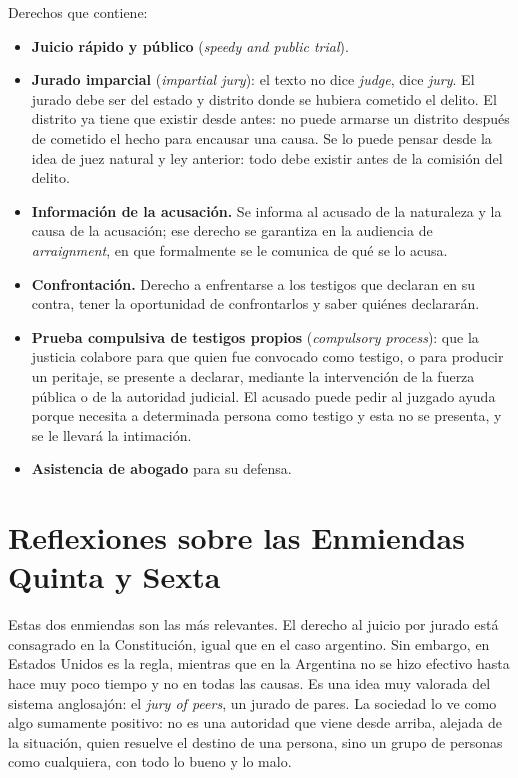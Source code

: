 \documentclass[12pt,oneside]{book}
\begin{document}
Derechos que contiene:

\begin{itemize}
    \item \textbf{Juicio rápido y público} (\textit{speedy and public trial}).
    \item \textbf{Jurado imparcial} (\textit{impartial jury}): el texto no dice \textit{judge}, dice \textit{jury}. El jurado debe ser del estado y distrito donde se hubiera cometido el delito. El distrito ya tiene que existir desde antes: no puede armarse un distrito después de cometido el hecho para encausar una causa. Se lo puede pensar desde la idea de juez natural y ley anterior: todo debe existir antes de la comisión del delito.
    \item \textbf{Información de la acusación.} Se informa al acusado de la naturaleza y la causa de la acusación; ese derecho se garantiza en la audiencia de \textit{arraignment}, en que formalmente se le comunica de qué se lo acusa.
    \item \textbf{Confrontación.} Derecho a enfrentarse a los testigos que declaran en su contra, tener la oportunidad de confrontarlos y saber quiénes declararán.
    \item \textbf{Prueba compulsiva de testigos propios} (\textit{compulsory process}): que la justicia colabore para que quien fue convocado como testigo, o para producir un peritaje, se presente a declarar, mediante la intervención de la fuerza pública o de la autoridad judicial. El acusado puede pedir al juzgado ayuda porque necesita a determinada persona como testigo y esta no se presenta, y se le llevará la intimación.
    \item \textbf{Asistencia de abogado} para su defensa.
\end{itemize}

\section{Reflexiones sobre las Enmiendas Quinta y Sexta}

Estas dos enmiendas son las más relevantes. El derecho al juicio por jurado está consagrado en la Constitución, igual que en el caso argentino. Sin embargo, en Estados Unidos es la regla, mientras que en la Argentina no se hizo efectivo hasta hace muy poco tiempo y no en todas las causas. Es una idea muy valorada del sistema anglosajón: el \textit{jury of peers}, un jurado de pares. La sociedad lo ve como algo sumamente positivo: no es una autoridad que viene desde arriba, alejada de la situación, quien resuelve el destino de una persona, sino un grupo de personas como cualquiera, con todo lo bueno y lo malo.
\end{document}
